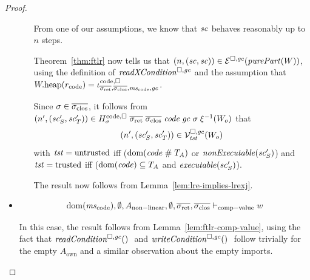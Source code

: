 \documentclass[a4paper]{article}
\begin{document}
\begin{proof}
\begin{itemize}
\begin{itemize}

      From one of our assumptions, we know that $\vsc$ behaves reasonably up to $n$ steps.

      Theorem~\ref{thm:ftlr} now tells us that $\npair{(\vsc,\vsc)} \in \lre(\purePart{W})$, using the definition of $\xReadCond{}$ and the assumption that $\pwheap(r_{\mathrm{code}}) = \codereg{\sigrets,\sigcloss,\mscode,\gc}$.

      Since $\sigma\in\sigcloss$, it follows from $\npair[n']{(\vsc_S',\vsc'_T)} \in H^\mathrm{code,\square}_\sigma \; \sigrets \; \sigcloss \; \code \; \gc \; \sigma \; \xi^{-1}(W_o)$ that
      \begin{equation*}
        \npair[n']{(\vsc_S',\vsc'_T)} \in \lrvg{\trust}(W_o)
      \end{equation*}
      with $\trust = \untrusted$ iff ($\dom(\code \mathrel{\#} \ta)$ or $\nonExec{\vsc_S'}$) and $\trust = \trusted$ iff ($\dom(\code) \subseteq \ta$ and $\exec{\vsc_S'}$).

      The result now follows from Lemma~\ref{lem:lre-implies-lrexj}.
    \end{itemize}

  \item
    \begin{equation*}
      \dom(\mscode),\emptyset,A_{\mathrm{non-linear}},\emptyset,\sigrets,\sigcloss \vdash_{\mathrm{comp-value}} w
    \end{equation*}

    In this case, the result follows from Lemma~\ref{lem:ftlr-comp-value}, using the fact that $\readCond$ and $\writeCond$ follow trivially for the empty $A_{\mathrm{own}}$ and a similar observation about the empty imports.
  \end{itemize}
\end{proof}
\end{document}
